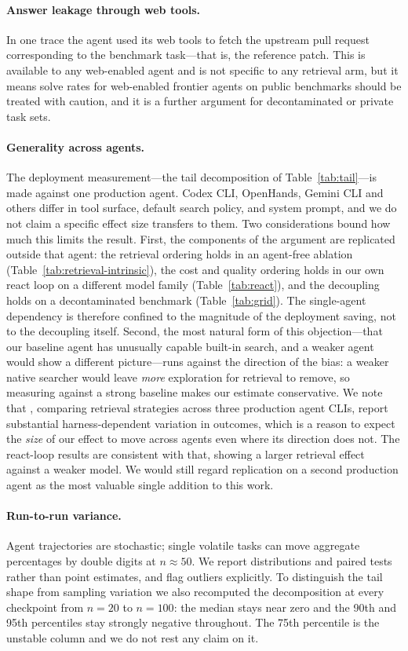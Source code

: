 \documentclass[11pt,letterpaper]{article}
\begin{document}
\paragraph{Answer leakage through web tools.}
In one trace the agent used its web tools to fetch the upstream pull request
corresponding to the benchmark task---that is, the reference patch. This is
available to any web-enabled agent and is not specific to any retrieval arm, but
it means solve rates for web-enabled frontier agents on public benchmarks should
be treated with caution, and it is a further argument for decontaminated or
private task sets.

\paragraph{Generality across agents.}
The deployment measurement---the tail decomposition of Table~\ref{tab:tail}---is
made against one production agent. Codex CLI, OpenHands, Gemini CLI and others
differ in tool surface, default search policy, and system prompt, and we do not
claim a specific effect size transfers to them. Two considerations bound how much
this limits the result. First, the components of the argument are replicated
outside that agent: the retrieval ordering holds in an agent-free ablation
(Table~\ref{tab:retrieval-intrinsic}), the cost and quality ordering holds in our
own react loop on a different model family (Table~\ref{tab:react}), and the
decoupling holds on a decontaminated benchmark (Table~\ref{tab:grid}). The
single-agent dependency is therefore confined to the magnitude of the deployment
saving, not to the decoupling itself. Second, the most natural form of this
objection---that our baseline agent has unusually capable built-in search, and a
weaker agent would show a different picture---runs against the direction of the
bias: a weaker native searcher would leave \emph{more} exploration for retrieval
to remove, so measuring against a strong baseline makes our estimate conservative.
We note that \citet{grepallyouneed}, comparing retrieval strategies across three
production agent CLIs, report substantial harness-dependent variation in outcomes,
which is a reason to expect the \emph{size} of our effect to move across agents
even where its direction does not.
The react-loop results are consistent with that, showing a larger retrieval effect
against a weaker model. We would still regard replication on a second production
agent as the most valuable single addition to this work.

\paragraph{Run-to-run variance.}
Agent trajectories are stochastic; single volatile tasks can move aggregate
percentages by double digits at $n\!\approx\!50$. We report distributions and
paired tests rather than point estimates, and flag outliers explicitly. To
distinguish the tail shape from sampling variation we also recomputed the
decomposition at every checkpoint from $n=20$ to $n=100$: the median stays near
zero and the 90th and 95th percentiles stay strongly negative throughout. The 75th
percentile is the unstable column and we do not rest any claim on it.
\end{document}
